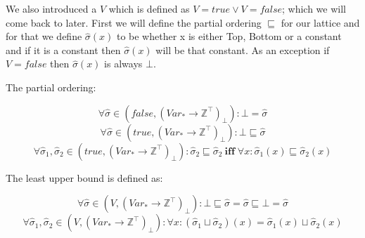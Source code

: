   We also introduced a $V$ which is defined as $V = true \vee V = false$; which
we will come back to later.  First we will define the partial ordering
$\sqsubseteq$ for our lattice and for that we define $\hat{\sigma}(x)$ to be
whether x is either Top, Bottom or a constant and if it is a constant then
$\hat{\sigma}(x)$ will be that constant. As an exception if $V = false$ then
$\hat{\sigma}(x)$ is always $\bot$.

\docpar
The partial ordering:

\[ \forall{}\hat{\sigma} \in (false, (Var_{*} \rightarrow
 \mathbb{Z}^{\top})_{\bot}): \bot = \hat{\sigma} \]
\[ \forall{}\hat{\sigma} \in (true, (Var_{*} \rightarrow
\mathbb{Z}^{\top})_{\bot}): \bot \sqsubseteq \hat{\sigma} \]
\[ \forall{}\hat{\sigma}_1,\hat{\sigma}_2 \in (true, (Var_{*} \rightarrow
\mathbb{Z}^{\top})_\bot): \hat{\sigma}_2 \sqsubseteq \hat{\sigma}_2 \:
\textbf{iff}  \; \forall{}x : \hat{\sigma}_1(x) \sqsubseteq \hat{\sigma}_2(x) \]

\docpar
The least upper bound is defined as:

\[ \forall{}\hat{\sigma} \in (V, (Var_{*} \rightarrow \mathbb{Z}^{\top})_{\bot}):
 \bot \sqsubseteq \hat{\sigma} = \hat{\sigma} \sqsubseteq \bot = \hat{\sigma} \]
\[ \forall{}\hat{\sigma}_1,\hat{\sigma}_2 \in (V, (Var_{*} \rightarrow
 \mathbb{Z}^{\top})_\bot): \forall{}x : (\hat{\sigma}_1 \sqcup \hat{\sigma}_2)(x) =
 \hat{\sigma}_1(x) \sqcup \hat{\sigma}_2(x) \]


